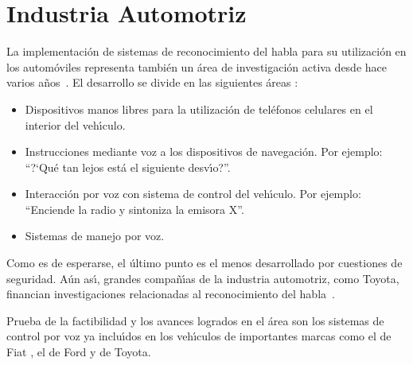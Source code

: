 \section{Industria Automotriz}
\label{sec:automotriz}

La implementaci\'on de sistemas de reconocimiento del habla para su utilizaci\'on en los autom\'oviles representa
tambi\'en un \'area de investigaci\'on activa desde hace varios \mbox{a\~nos \cite{HanaiS94, HuaSpeech2010}}. 
El desarrollo se divide en las siguientes \'areas \cite{Kirriemuir2003Speech}:

\begin{itemize}
	\item Dispositivos manos libres para la utilizaci\'on de tel\'efonos celulares en el interior del veh{\'\i}culo.
	\item Instrucciones mediante voz a los dispositivos de navegaci\'on. Por ejemplo: ``{?`}Qu\'e tan lejos est\'a el siguiente desv{\'\i}o?''.
	\item Interacci\'on por voz con sistema de control del veh{\'\i}culo. Por ejemplo: ``Enciende la radio y sintoniza la emisora X''.
	\item Sistemas de manejo por voz.
\end{itemize}

Como es de esperarse, el \'ultimo punto es el menos desarrollado por cuestiones de seguridad. A\'un as{\'\i}, grandes compa\~n{\'\i}as
de la industria automotriz, como Toyota, financian investigaciones relacionadas al reconocimiento del \mbox{habla \cite{HoshinoSpeech2004}}.

Prueba de la factibilidad y los avances logrados en el \'area son los sistemas de control por voz ya inclu{\'\i}dos en los
veh{\'\i}culos de importantes marcas como el  de Fiat \cite{FiatBlue}, el  de Ford \cite{FordSync}
y  \cite{ToyotaEntune} de Toyota.

